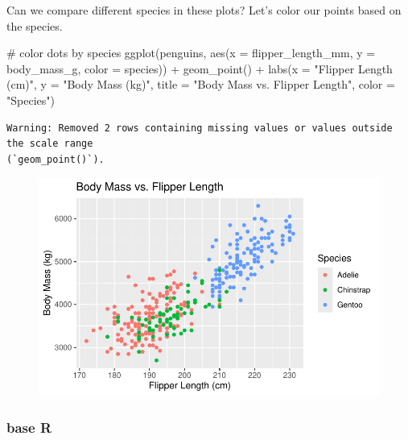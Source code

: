 \documentclass[
  letterpaper,
  DIV=11,
  numbers=noendperiod]{scrreprt}
\newenvironment{Shaded}{\begin{snugshade}}{\end{snugshade}}
\newcommand{\AttributeTok}[1]{\textcolor[rgb]{0.40,0.45,0.13}{#1}}
\newcommand{\CommentTok}[1]{\textcolor[rgb]{0.37,0.37,0.37}{#1}}
\newcommand{\FunctionTok}[1]{\textcolor[rgb]{0.28,0.35,0.67}{#1}}
\newcommand{\NormalTok}[1]{\textcolor[rgb]{0.00,0.23,0.31}{#1}}
\newcommand{\SpecialCharTok}[1]{\textcolor[rgb]{0.37,0.37,0.37}{#1}}
\newcommand{\StringTok}[1]{\textcolor[rgb]{0.13,0.47,0.30}{#1}}
\begin{document}
Can we compare different species in these plots? Let's color our points
based on the species.

\begin{Shaded}
\begin{Highlighting}[]
\CommentTok{\# color dots by species}
\FunctionTok{ggplot}\NormalTok{(penguins, }\FunctionTok{aes}\NormalTok{(}\AttributeTok{x =}\NormalTok{ flipper\_length\_mm, }\AttributeTok{y =}\NormalTok{ body\_mass\_g, }\AttributeTok{color =}\NormalTok{ species)) }\SpecialCharTok{+}
  \FunctionTok{geom\_point}\NormalTok{() }\SpecialCharTok{+}
  \FunctionTok{labs}\NormalTok{(}\AttributeTok{x =} \StringTok{"Flipper Length (cm)"}\NormalTok{, }\AttributeTok{y =} \StringTok{"Body Mass (kg)"}\NormalTok{,}
       \AttributeTok{title =} \StringTok{"Body Mass vs. Flipper Length"}\NormalTok{,}
       \AttributeTok{color =} \StringTok{"Species"}\NormalTok{)}
\end{Highlighting}
\end{Shaded}

\begin{verbatim}
Warning: Removed 2 rows containing missing values or values outside the scale range
(`geom_point()`).
\end{verbatim}

\begin{figure}[H]

{\centering \includegraphics{scripts/02_dataViz/class4_files/figure-pdf/num_vs_num_species_ggplot-1.pdf}

}

\end{figure}

\hypertarget{base-r-3}{%
\subsubsection{base R}\label{base-r-3}}
\end{document}
